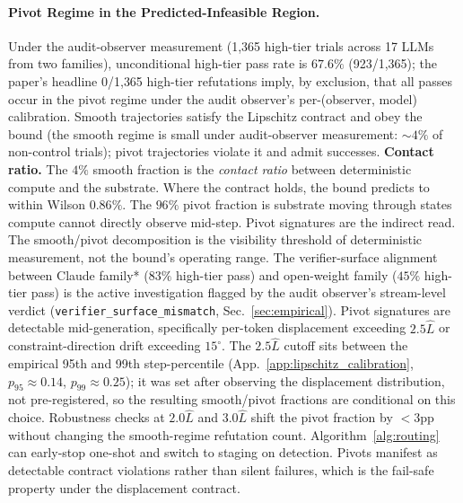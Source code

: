 \documentclass{article}
\theoremstyle{plain}
\theoremstyle{definition}
\theoremstyle{remark}
\newcommand{\appref}[1]{App.~\ref{#1}}
\newcommand{\secref}[1]{Sec.~\ref{#1}}
\begin{document}
\paragraph{Pivot Regime in the Predicted-Infeasible Region.}
Under the audit-observer measurement (1{,}365 high-tier trials across 17 LLMs from two families), unconditional high-tier pass rate is $67.6\%$ (923/1{,}365); the paper's headline 0/1{,}365 high-tier refutations imply, by exclusion, that all passes occur in the pivot regime under the audit observer's per-(observer, model) calibration. Smooth trajectories satisfy the Lipschitz contract and obey the bound (the smooth regime is small under audit-observer measurement: ${\sim}4\%$ of non-control trials); pivot trajectories violate it and admit successes. \textbf{Contact ratio.} The $4\%$ smooth fraction is the \emph{contact ratio} between deterministic compute and the substrate. Where the contract holds, the bound predicts to within Wilson $0.86\%$. The $96\%$ pivot fraction is substrate moving through states compute cannot directly observe mid-step. Pivot signatures are the indirect read. The smooth/pivot decomposition is the visibility threshold of deterministic measurement, not the bound's operating range. The verifier-surface alignment between Claude family* ($83\%$ high-tier pass) and open-weight family ($45\%$ high-tier pass) is the active investigation flagged by the audit observer's stream-level verdict (\texttt{verifier\_surface\_mismatch}, \secref{sec:empirical}). Pivot signatures are detectable mid-generation, specifically per-token displacement exceeding $2.5\hat{L}$ or constraint-direction drift exceeding $15^\circ$. The $2.5\hat{L}$ cutoff sits between the empirical 95th and 99th step-percentile (\appref{app:lipschitz_calibration}, $p_{95}{\approx}0.14$, $p_{99}{\approx}0.25$); it was set after observing the displacement distribution, not pre-registered, so the resulting smooth/pivot fractions are conditional on this choice. Robustness checks at $2.0\hat{L}$ and $3.0\hat{L}$ shift the pivot fraction by ${<}3$pp without changing the smooth-regime refutation count. Algorithm~\ref{alg:routing} can early-stop one-shot and switch to staging on detection. Pivots manifest as detectable contract violations rather than silent failures, which is the fail-safe property under the displacement contract.
\end{document}
